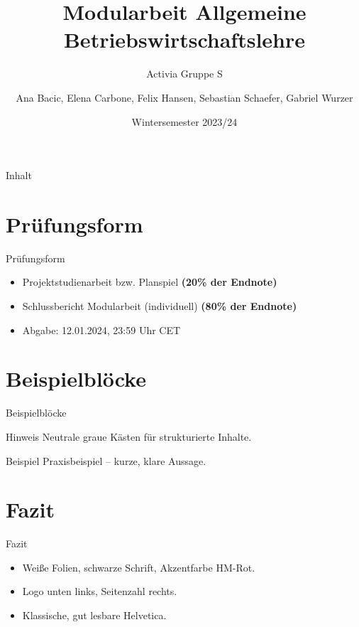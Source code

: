 \documentclass[aspectratio=169,10pt]{beamer}
\title{Modularbeit Allgemeine Betriebswirtschaftslehre}
\subtitle{Activia Gruppe S}
\author{Ana Bacic, Elena Carbone, Felix Hansen, Sebastian Schaefer, Gabriel Wurzer}
\institute{Hochschule München \\ Fakultät für Betriebswirtschaft}
\date{Wintersemester 2023/24}
\begin{document}
\begin{frame}[plain]
  \titlepage
\end{frame}

\begin{frame}{Inhalt}
  \tableofcontents
\end{frame}

\section{Prüfungsform}
\begin{frame}{Prüfungsform}
\begin{itemize}
  \item Projektstudienarbeit bzw. Planspiel \textbf{(20\% der Endnote)}
  \item Schlussbericht Modularbeit (individuell) \textbf{(80\% der Endnote)}
  \item Abgabe: 12.01.2024, 23:59 Uhr CET
\end{itemize}
\end{frame}

\section{Beispielblöcke}
\begin{frame}{Beispielblöcke}
\begin{block}{Hinweis}
  Neutrale graue Kästen für strukturierte Inhalte.
\end{block}
\begin{exampleblock}{Beispiel}
  Praxisbeispiel – kurze, klare Aussage.
\end{exampleblock}
\end{frame}

\section{Fazit}
\begin{frame}{Fazit}
\begin{itemize}
  \item Weiße Folien, schwarze Schrift, Akzentfarbe \textcolor{HMRed}{HM-Rot}.
  \item Logo unten links, Seitenzahl rechts.
  \item Klassische, gut lesbare Helvetica.
\end{itemize}
\end{frame}
\end{document}
